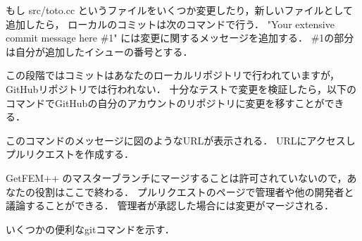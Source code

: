 \documentclass{ltjoc}
\begin{document}
\begin{shbox}
  \shuser{}
\end{shbox}

もし src/toto.cc というファイルをいくつか変更したり，新しいファイルとして追加したら，
ローカルのコミットは次のコマンドで行う．
"Your extensive commit message here \#1" には変更に関するメッセージを追加する．
\#1の部分は自分が追加したイシューの番号とする．

\begin{shbox}
  \shuser{}
\end{shbox}

この段階ではコミットはあなたのローカルリポジトリで行われていますが，GitHubリポジトリでは行われない．
十分なテストで変更を検証したら，以下のコマンドでGitHubの自分のアカウントのリポジトリに変更を移すことができる．

\begin{shbox}
  \shuser{}
\end{shbox}


このコマンドのメッセージに図のようなURLが表示される．
URLにアクセスしプルリクエストを作成する．

GetFEM++ のマスターブランチにマージすることは許可されていないので，あなたの役割はここで終わる．
プルリクエストのページで管理者や他の開発者と議論することができる．
管理者が承認した場合には変更がマージされる．

いくつかの便利なgitコマンドを示す．

\begin{shbox}
  \shuser{}
\end{shbox}
\end{document}
